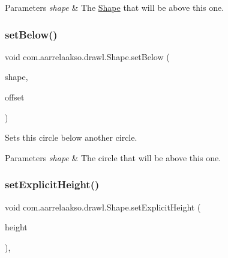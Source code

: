 \begin{DoxyParams}{Parameters}
{\em shape} & The \hyperlink{classcom_1_1aarrelaakso_1_1drawl_1_1_shape}{Shape} that will be above this one. \\
\hline
\end{DoxyParams}
\mbox{\label{classcom_1_1aarrelaakso_1_1drawl_1_1_shape_a63c902c4e79235901744c6d83544fa54}} 
\subsubsection{\texorpdfstring{set\+Below()}{setBelow()}\hspace{0.1cm}{\footnotesize\ttfamily [2/2]}}
{\footnotesize\ttfamily void com.\+aarrelaakso.\+drawl.\+Shape.\+set\+Below (\begin{DoxyParamCaption}\item[{@Not\+Null final \hyperlink{classcom_1_1aarrelaakso_1_1drawl_1_1_shape}{Shape}}]{shape,  }\item[{@Not\+Null final \hyperlink{classcom_1_1aarrelaakso_1_1drawl_1_1_measure}{Measure}}]{offset }\end{DoxyParamCaption})\hspace{0.3cm}{\ttfamily [inherited]}}



Sets this circle below another circle. 


\begin{DoxyParams}{Parameters}
{\em shape} & The circle that will be above this one. \\
\hline
\end{DoxyParams}
\mbox{\label{classcom_1_1aarrelaakso_1_1drawl_1_1_shape_a3680a63cef0d766132d1f64813ca8eca}} 
\subsubsection{\texorpdfstring{set\+Explicit\+Height()}{setExplicitHeight()}}
{\footnotesize\ttfamily void com.\+aarrelaakso.\+drawl.\+Shape.\+set\+Explicit\+Height (\begin{DoxyParamCaption}\item[{@Nullable final \hyperlink{interfacecom_1_1aarrelaakso_1_1drawl_1_1_number}{Number}}]{height }\end{DoxyParamCaption})\hspace{0.3cm}{\ttfamily [protected]}, {\ttfamily [inherited]}}



